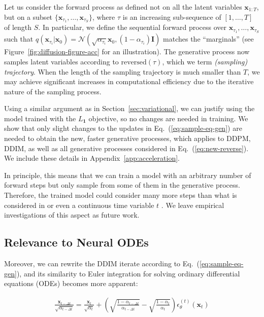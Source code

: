 Let us consider the forward process as defined not on all the latent variables ${\bm{x}}_{1:T}$, but on a subset $\{{\bm{x}}_{\tau_1}, \ldots, {\bm{x}}_{\tau_S}\}$, where $\tau$ is an increasing sub-sequence of $[1, \ldots, T]$ of length $S$. In particular, we define the sequential forward process over ${\bm{x}}_{\tau_1}, \ldots, {\bm{x}}_{\tau_S}$ such that $q({\bm{x}}_{\tau_i} | {\bm{x}}_0) = {\mathcal{N}}(\sqrt{\alpha_{\tau_i}} {\bm{x}}_0, (1 - \alpha_{\tau_i}) {\bm{I}})$ matches the ``marginals'' (see Figure~\ref{fig:diffusion-figure-acc} for an illustration). The generative process now samples latent variables according to $\text{reversed}(\tau)$, which we term \textit{(sampling) trajectory}. When the length of the sampling trajectory is much smaller than $T$, we may achieve significant increases in computational efficiency due to the iterative nature of the sampling process. 

Using a similar argument as in Section~\ref{sec:variational}, we can justify using the model trained with the $L_{\bm{1}}$ objective, so no changes are needed in training. We show that only slight changes to the updates in Eq.~(\ref{eq:sample-eq-gen}) are needed to obtain the new, faster generative processes, which applies to DDPM, DDIM, as well as all generative processes considered in Eq.~(\ref{eq:new-reverse}).
We include these details in Appendix~\ref{app:acceleration}.

In principle, this means that we can train a model with an arbitrary number of forward steps but only sample from some of them in the generative process. Therefore, the trained model could consider many more steps than what is considered in \citep{ho2020denoising} or even a continuous time variable $t$ \citep{chen2020wavegrad}. We leave empirical investigations of this aspect as future work.

\subsection{Relevance to Neural ODEs} Moreover, we can rewrite the DDIM iterate according to Eq.~(\ref{eq:sample-eq-gen}), and its similarity to Euler integration for solving ordinary differential equations (ODEs) becomes more apparent:

\begin{align}
    \frac{{\bm{x}}_{t-\Delta t}}{\sqrt{\alpha_{t-\Delta t}}}  = \frac{{\bm{x}}_t}{\sqrt{\alpha_t}}  + \left(\sqrt{\frac{1 - \alpha_{t-\Delta t}}{\alpha_{t-\Delta t}}} - \sqrt{\frac{1 - \alpha_{t}}{\alpha_t}}\right) \epsilon_\theta^{(t)}({\bm{x}}_t) \label{eq:ddim-euler}
\end{align}

